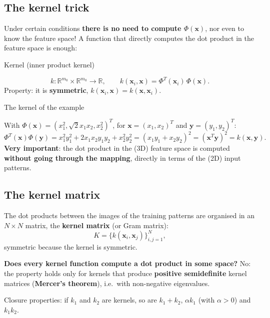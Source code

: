 \subsection{The kernel trick}\label{il-kernel-trick}

Under certain conditions \textbf{there is no need to compute
\(\Phi(\mathbf{x})\)}, nor even to know the feature space! A function
that directly computes the dot product in the feature space is enough:

\begin{boxdefinition}{Kernel (inner product kernel)}

\[
k: \mathbb{R}^{m_0} \times \mathbb{R}^{m_0} \to \mathbb{R}, \qquad k(\mathbf{x}_i, \mathbf{x}) = \Phi^T(\mathbf{x}_i)\,\Phi(\mathbf{x}).
\] Property: it is \textbf{symmetric},
\(k(\mathbf{x}_i, \mathbf{x}) = k(\mathbf{x}, \mathbf{x}_i)\).

\end{boxdefinition}

\begin{boxexample}{The kernel of the example}

With \(\Phi(\mathbf{x}) = (x_1^2, \sqrt{2}x_1x_2, x_2^2)^T\), for
\(\mathbf{x} = (x_1, x_2)^T\) and \(\mathbf{y} = (y_1, y_2)^T\): \[
\Phi^T(\mathbf{x})\Phi(\mathbf{y}) = x_1^2y_1^2 + 2x_1x_2y_1y_2 + x_2^2y_2^2 = (x_1y_1 + x_2y_2)^2 = (\mathbf{x}^T\mathbf{y})^2 = k(\mathbf{x}, \mathbf{y}).
\] \textbf{Very important}: the dot product in the (3D) feature space
is computed \textbf{without going through the mapping}, directly in
terms of the (2D) input patterns.

\end{boxexample}

\subsection{The kernel matrix}\label{la-matrice-kernel}

The dot products between the images of the training patterns are
organised in an \(N \times N\) matrix, the \textbf{kernel matrix} (or
Gram matrix): \[
K = \{k(\mathbf{x}_i, \mathbf{x}_j)\}_{i,j=1}^N,
\] symmetric because the kernel is symmetric.

\textbf{Does every kernel function compute a dot product in some
space?} No: the property holds only for kernels that produce
\textbf{positive semidefinite} kernel matrices (\textbf{Mercer's
theorem}), i.e.\ with non-negative eigenvalues.

Closure properties: if \(k_1\) and \(k_2\) are kernels, so are
\(k_1 + k_2\), \(\alpha k_1\) (with \(\alpha > 0\)) and \(k_1 k_2\).


